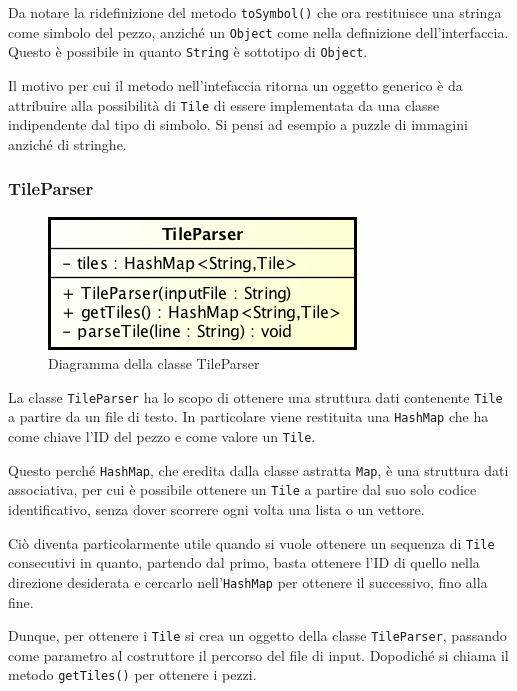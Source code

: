 \documentclass[a4paper, 12pt]{article}
\begin{document}
        Da notare la ridefinizione del metodo \verb|toSymbol()| che ora restituisce una stringa come simbolo del pezzo, anziché un \verb|Object| come nella definizione dell'interfaccia. Questo è possibile in quanto \verb|String| è sottotipo di \verb|Object|.

        Il motivo per cui il metodo nell'intefaccia ritorna un oggetto generico è da attribuire alla possibilità di \verb|Tile| di essere implementata da una classe indipendente dal tipo di simbolo. Si pensi ad esempio a puzzle di immagini anziché di stringhe.

      \subsubsection{TileParser}

        \begin{figure}[H]

          \centering
          \includegraphics[scale=0.7]{uml/tileparser.png}
          \caption{Diagramma della classe TileParser}
          \label{uml:tileparser}

        \end{figure}

        La classe \verb|TileParser| ha lo scopo di ottenere una struttura dati contenente \verb|Tile| a partire da un file di testo. In particolare viene restituita una \verb|HashMap| che ha come chiave l'ID del pezzo e come valore un \verb|Tile|. 

        Questo perché \verb|HashMap|, che eredita dalla classe astratta \verb|Map|, è una struttura dati associativa, per cui è possibile ottenere un \verb|Tile| a partire dal suo solo codice identificativo, senza dover scorrere ogni volta una lista o un vettore. 

        Ciò diventa particolarmente utile quando si vuole ottenere un sequenza di \verb|Tile| consecutivi in quanto, partendo dal primo, basta ottenere l'ID di quello nella direzione desiderata e cercarlo nell'\verb|HashMap| per ottenere il successivo, fino alla fine.

        Dunque, per ottenere i \verb|Tile| si crea un oggetto della classe \verb|TileParser|, passando come parametro al costruttore il percorso del file di input. Dopodiché si chiama il metodo \verb|getTiles()| per ottenere i pezzi. 
\end{document}
